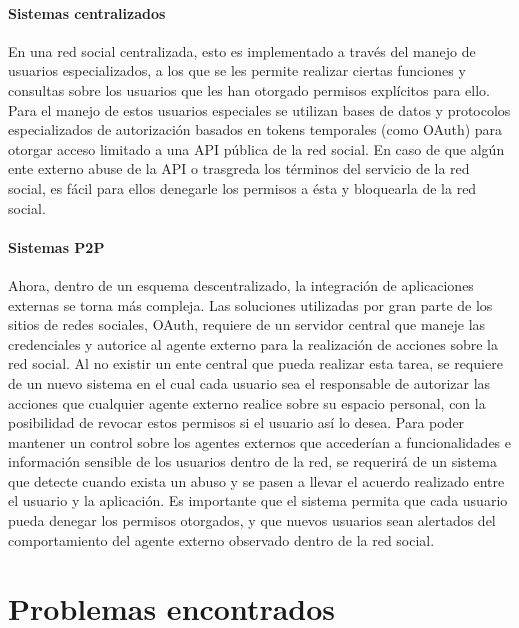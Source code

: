     \paragraph{Sistemas centralizados}
    En una red social centralizada, esto es implementado a través del manejo de
    usuarios especializados, a los que se les permite realizar ciertas funciones y
    consultas sobre los usuarios que les han otorgado permisos explícitos para ello.
    Para el manejo de estos usuarios especiales se utilizan bases de datos y
    protocolos especializados de autorización basados en tokens temporales (como
    OAuth) para otorgar acceso limitado a una API pública de la red social. En caso
    de que algún ente externo abuse de la API o trasgreda los términos del servicio
    de la red social, es fácil para ellos denegarle los permisos a ésta y
    bloquearla de la red social.
    
    \paragraph{Sistemas P2P}
    Ahora, dentro de un esquema descentralizado, la integración de aplicaciones
    externas se torna más compleja. Las soluciones utilizadas por gran parte de los
    sitios de redes sociales, OAuth, requiere de un servidor
    central que maneje las credenciales y autorice al agente externo para la
    realización de acciones sobre la red social. Al no existir un ente central
    que pueda realizar esta tarea, se requiere de un nuevo sistema en el cual 
    cada usuario sea el responsable de autorizar las acciones que cualquier agente
    externo realice sobre su espacio personal, con la posibilidad de revocar estos
    permisos si el usuario así lo desea.
    Para poder mantener un control sobre los agentes externos que accederían a
    funcionalidades e información sensible de los usuarios dentro de la red, se
    requerirá de un sistema que detecte cuando exista un abuso y se pasen a llevar
    el acuerdo realizado entre el usuario y la aplicación. Es importante que el
    sistema permita que cada usuario pueda denegar los permisos otorgados, y que
    nuevos usuarios sean alertados del comportamiento del agente externo observado
    dentro de la red social.


\section{Problemas encontrados}

